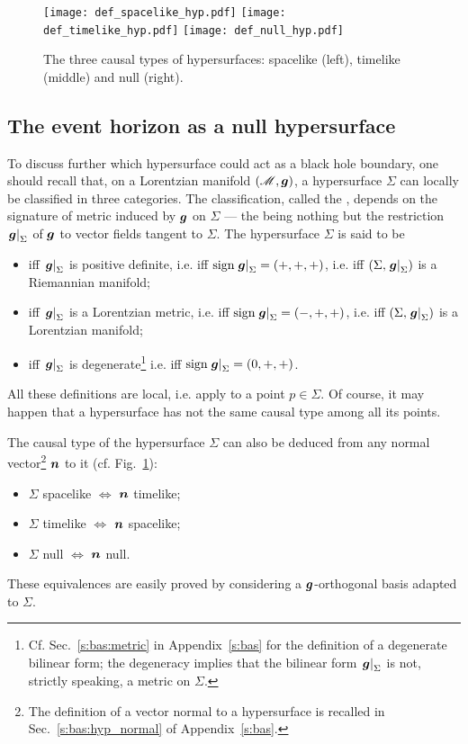 \begin{figure}
\centerline{\texttt{[image: def\_spacelike\_hyp.pdf]}
\texttt{[image: def\_timelike\_hyp.pdf]}
\texttt{[image: def\_null\_hyp.pdf]}}
\caption[]{\label{f:def:hypersurfaces} \footnotesize
The three causal types of hypersurfaces:
spacelike (left), timelike (middle) and null (right).}
\end{figure}

\subsection{The event horizon as a null hypersurface} \label{s:def:hor_as_null}

To discuss further which hypersurface could act as a black hole boundary,
one should recall that, on a Lorentzian manifold $(\mathscr{M},\bm{g})$,
a hypersurface $\Sigma$ can locally be classified in three categories.
The classification, called the ,
depends on the signature of metric induced by $\bm{g}$ on
$\Sigma$  --- the
 being
nothing but the restriction $\left.\bm{g}\right| _{\Sigma}$ of $\bm{g}$
to vector fields tangent to $\Sigma$.
The hypersurface $\Sigma$ is said to be
\begin{itemize}
\item {} iff $\left.\bm{g}\right| _{\Sigma}$ is positive definite,
i.e. iff $\mathrm{sign} \left.\bm{g}\right| _{\Sigma} = (+,+,+)$,
i.e. iff $(\Sigma,  \left.\bm{g}\right| _{\Sigma})$ is a Riemannian manifold;
\item {} iff $\left.\bm{g}\right| _{\Sigma}$ is a Lorentzian metric,
i.e. iff $\mathrm{sign} \left.\bm{g}\right| _{\Sigma} = (-,+,+)$,
i.e. iff $(\Sigma,  \left.\bm{g}\right| _{\Sigma})$ is a Lorentzian manifold;
\item {} iff $\left.\bm{g}\right| _{\Sigma}$ is degenerate\footnote{
Cf. Sec.~\ref{s:bas:metric} in Appendix~\ref{s:bas} for the definition of a
degenerate bilinear form; the degeneracy
implies that the bilinear form $\left.\bm{g}\right| _{\Sigma}$ is not,
strictly speaking, a metric on $\Sigma$.}
i.e. iff $\mathrm{sign} \left.\bm{g}\right| _{\Sigma} = (0,+,+)$.
\end{itemize}
All these definitions are local, i.e. apply to a point $p\in\Sigma$.
Of course, it may happen that a hypersurface has not the same causal type
among all its points.

The causal type of the hypersurface $\Sigma$
can also be deduced from any normal vector\footnote{
The definition of a vector normal to a hypersurface is recalled in Sec.~\ref{s:bas:hyp_normal} of Appendix~\ref{s:bas}.}
$\bm{n}$ to it (cf. Fig.~\ref{f:def:hypersurfaces}):
\begin{itemize}
\item $\Sigma$ spacelike $\iff$ $\bm{n}$ timelike;
\item $\Sigma$ timelike $\iff$ $\bm{n}$ spacelike;
\item $\Sigma$ null $\iff$ $\bm{n}$ null.
\end{itemize}
These equivalences are easily proved by considering a $\bm{g}$-orthogonal basis
adapted to $\Sigma$.

